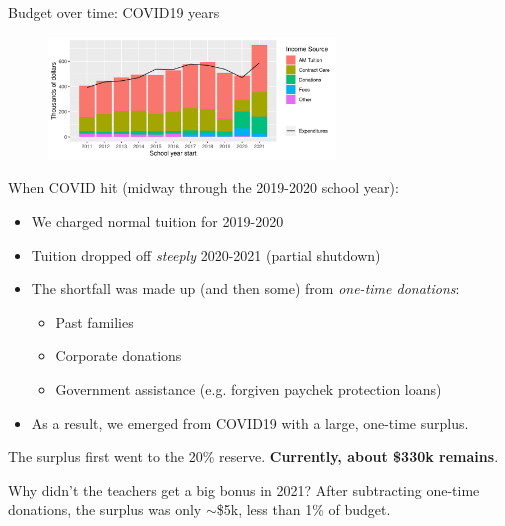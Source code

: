 \documentclass[8pt]{beamer}
\begin{document}
\begin{frame}{Budget over time: COVID19 years}
\begin{figure}
\begin{center}
\includegraphics[width=3in]{budget_history_w_income_source.png}
\end{center}
\end{figure}

When COVID hit (midway through the 2019-2020 school year):
%
\begin{itemize}
%
\item We charged normal tuition for 2019-2020
\item Tuition dropped off {\em steeply} 2020-2021 (partial shutdown)
\item The shortfall was made up (and then some) from {\em one-time donations}:
\begin{itemize}
    \item Past families
    \item Corporate donations
    \item Government assistance (e.g. forgiven paychek protection loans)
\end{itemize}
\item As a result, we emerged from COVID19 with a large, one-time surplus.
%
\end{itemize}
%
The surplus first went to the 20\% reserve.
\textbf{Currently, about \$330k remains}.

Why didn't the teachers get a big bonus in 2021?  After subtracting one-time
donations, the surplus was only $\sim$\$5k, less than 1\% of budget.

\end{frame}


\end{document}
